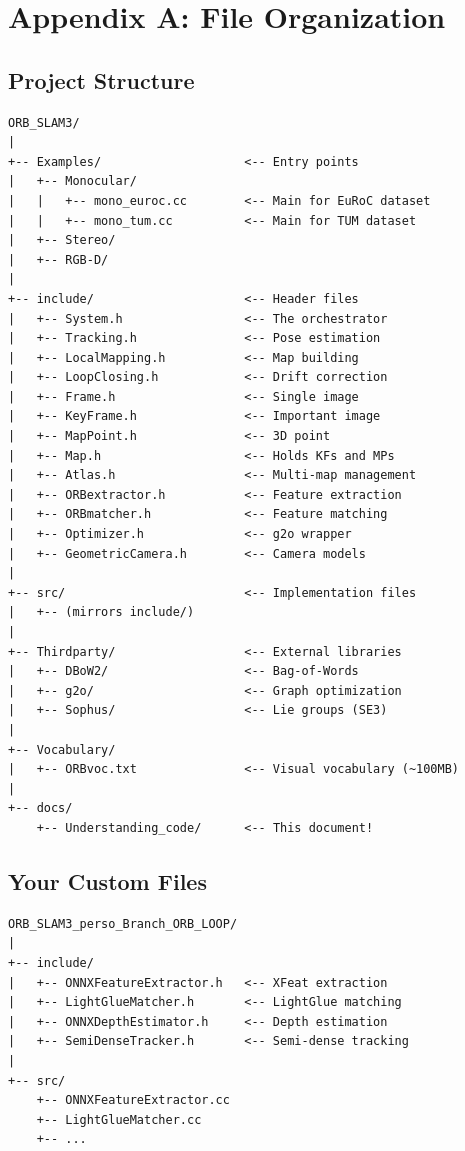 \section{Appendix A: File Organization}

\subsection{Project Structure}

\begin{verbatim}
ORB_SLAM3/
|
+-- Examples/                    <-- Entry points
|   +-- Monocular/
|   |   +-- mono_euroc.cc        <-- Main for EuRoC dataset
|   |   +-- mono_tum.cc          <-- Main for TUM dataset
|   +-- Stereo/
|   +-- RGB-D/
|
+-- include/                     <-- Header files
|   +-- System.h                 <-- The orchestrator
|   +-- Tracking.h               <-- Pose estimation
|   +-- LocalMapping.h           <-- Map building
|   +-- LoopClosing.h            <-- Drift correction
|   +-- Frame.h                  <-- Single image
|   +-- KeyFrame.h               <-- Important image
|   +-- MapPoint.h               <-- 3D point
|   +-- Map.h                    <-- Holds KFs and MPs
|   +-- Atlas.h                  <-- Multi-map management
|   +-- ORBextractor.h           <-- Feature extraction
|   +-- ORBmatcher.h             <-- Feature matching
|   +-- Optimizer.h              <-- g2o wrapper
|   +-- GeometricCamera.h        <-- Camera models
|
+-- src/                         <-- Implementation files
|   +-- (mirrors include/)
|
+-- Thirdparty/                  <-- External libraries
|   +-- DBoW2/                   <-- Bag-of-Words
|   +-- g2o/                     <-- Graph optimization
|   +-- Sophus/                  <-- Lie groups (SE3)
|
+-- Vocabulary/
|   +-- ORBvoc.txt               <-- Visual vocabulary (~100MB)
|
+-- docs/
    +-- Understanding_code/      <-- This document!
\end{verbatim}

\subsection{Your Custom Files}

\begin{verbatim}
ORB_SLAM3_perso_Branch_ORB_LOOP/
|
+-- include/
|   +-- ONNXFeatureExtractor.h   <-- XFeat extraction
|   +-- LightGlueMatcher.h       <-- LightGlue matching
|   +-- ONNXDepthEstimator.h     <-- Depth estimation
|   +-- SemiDenseTracker.h       <-- Semi-dense tracking
|
+-- src/
    +-- ONNXFeatureExtractor.cc
    +-- LightGlueMatcher.cc
    +-- ...
\end{verbatim}


